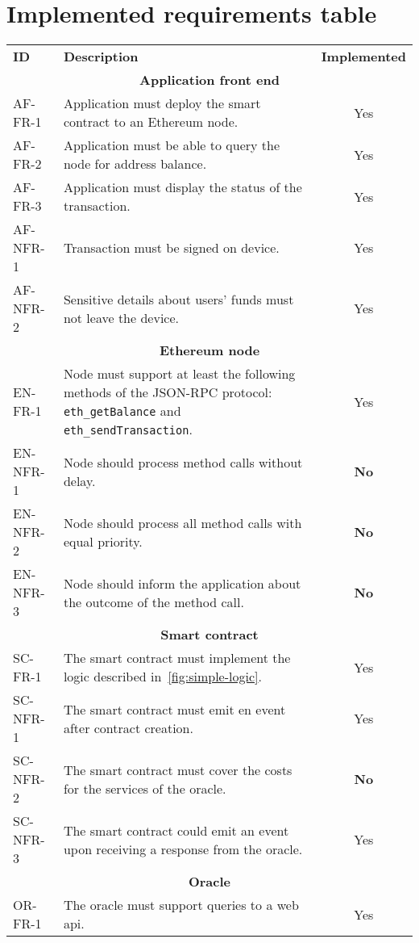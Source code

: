 \section{Implemented requirements table}\label{sec:appendix-table}
\begin{table}[H]
    \centering
    \begin{tabularx}{\textwidth}{|l X c|}
    \hline
    \textbf{ID}&\textbf{Description}&\textbf{Implemented}\\
    \multicolumn{3}{|c|}{\textbf{Application front end}}\\
    AF-FR-1&Application must deploy the smart contract to an Ethereum node.&Yes\\
    AF-FR-2&Application must be able to query the node for address balance.&Yes\\
    AF-FR-3&Application must display the status of the transaction.&Yes\\
    AF-NFR-1&Transaction must be signed on device.&Yes\\
    AF-NFR-2&Sensitive details about users' funds must not leave the device.&Yes\\
    \multicolumn{3}{|c|}{\textbf{Ethereum node}}\\
    EN-FR-1&Node must support at least the following methods of the JSON-RPC protocol: \texttt{eth\_getBalance} and \texttt{eth\_sendTransaction}.&Yes\\
    EN-NFR-1&Node should process method calls without delay.&\textbf{No}\\
    EN-NFR-2&Node should process all method calls with equal priority.&\textbf{No}\\
    EN-NFR-3&Node should inform the application about the outcome of the method call.&\textbf{No}\\
    \multicolumn{3}{|c|}{\textbf{Smart contract}}\\
    SC-FR-1&The smart contract must implement the logic described in~\ref{fig:simple-logic}.&Yes\\
    SC-NFR-1&The smart contract must emit en event after contract creation.&Yes\\
    SC-NFR-2&The smart contract must cover the costs for the services of the oracle.&\textbf{No}\\
    SC-NFR-3&The smart contract could emit an event upon receiving a response from the oracle.&Yes\\
    \multicolumn{3}{|c|}{\textbf{Oracle}}\\
    OR-FR-1&The oracle must support queries to a web \acrshort{api}.&Yes\\

\end{tabularx}
\end{table}
